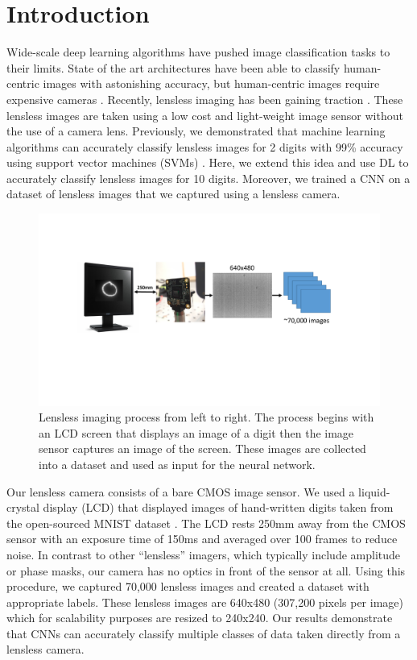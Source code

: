 \documentclass{osa-article}
\begin{document}
\section{Introduction}
Wide-scale deep learning algorithms have pushed image classification tasks to their limits. State of the art architectures have been able to classify human-centric images with astonishing accuracy, but human-centric images require expensive cameras \cite{DBLP:journals/corr/SimonyanZ14a, DBLP:journals/corr/SzegedyIV16}. Recently, lensless imaging has been gaining traction \cite{DBLP:journals/corr/AsifASVB15, Gill:13, DBLP:journals/corr/KimIPM17}. These lensless images are taken using a low cost and light-weight image sensor without the use of a camera lens. Previously, we demonstrated that machine learning algorithms can accurately classify lensless images for 2 digits with 99\% accuracy using support vector machines (SVMs) \cite{DBLP:journals/corr/abs-1709-00408}. Here, we extend this idea and use DL to accurately classify lensless images for 10 digits. Moreover, we trained a CNN on a dataset of lensless images that we captured using a lensless camera.
%
\begin{figure}[!ht]
\centering
\includegraphics[width=1\linewidth]{imagingprocess}
\caption{Lensless imaging process from left to right. The process begins with an LCD screen that displays an image of a digit then the image sensor captures an image of the screen. These images are collected into a dataset and used as input for the neural network.}\label{imagingprocess}
\end{figure}
%
Our lensless camera consists of a bare CMOS image sensor. We used a liquid-crystal display (LCD) that displayed images of hand-written digits taken from the open-sourced MNIST dataset \cite{lecun-mnisthandwrittendigit-2010}. The LCD rests 250mm away from the CMOS sensor with an exposure time of 150ms and averaged over 100 frames to reduce noise. In contrast to other ``lensless'' imagers, which typically include amplitude or phase masks, our camera has no optics in front of the sensor at all. Using this procedure, we captured 70,000 lensless images and created a dataset with appropriate labels. These lensless images are 640x480 (307,200 pixels per image) which for scalability purposes are resized to 240x240.
%
Our results demonstrate that CNNs can accurately classify multiple classes of data taken directly from a lensless camera.
%
\end{document}
